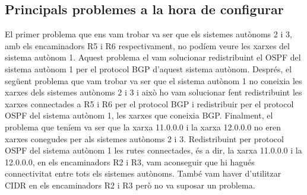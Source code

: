 \documentclass[10pt]{article}
\begin{document}
\subsection{Principals problemes a la hora de configurar}
El primer problema que ens vam trobar va ser que els sistemes autònoms 2 i 3, amb els encaminadors R5 i R6 respectivament, no podíem veure les xarxes del sistema autònom 1. Aquest problema el vam solucionar redistribuint el OSPF del sistema autònom 1 per el protocol BGP d'aquest sistema autònom. Després, el següent problema que vam trobar va ser que el sistema autònom 1 no coneixia les xarxes dels sistemes autònoms 2 i 3 i això ho vam solucionar fent redistribuint les xarxes connectades a R5 i R6 per el protocol BGP i redistribuir per el protocol OSPF del sistema autònom 1, les xarxes que coneixia BGP. Finalment, el problema que teníem va ser que la xarxa 11.0.0.0 i la xarxa 12.0.0.0 no eren xarxes conegudes per als sistemes autònoms 2 i 3. Redistribuint per protocol OSPF del sistema autònom 1 les rutes connectades, és a dir, la xarxa 11.0.0.0 i la 12.0.0.0, en els encaminadors R2 i R3, vam aconseguir que hi hagués connectivitat entre tots els sistemes autònoms. També vam haver d'utilitzar CIDR en els encaminadors R2 i R3 però no va suposar un problema.
\end{document}
